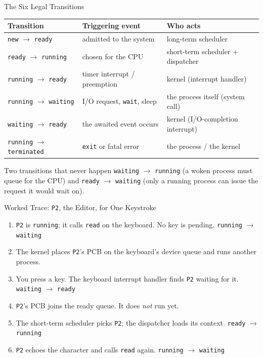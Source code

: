\documentclass[aspectratio=169]{beamer}
\begin{document}
\begin{frame}{The Six Legal Transitions}
  \small
  \renewcommand{\arraystretch}{1.2}
  \begin{tabular}{@{}p{}p{}p{}@{}}
    \textbf{Transition} & \textbf{Triggering event} & \textbf{Who acts} \\
    \hline
    \texttt{new} $\to$ \texttt{ready} & admitted to the system & long-term scheduler \\
    \texttt{ready} $\to$ \texttt{running} & chosen for the CPU & short-term scheduler + dispatcher \\
    \texttt{running} $\to$ \texttt{ready} & timer interrupt / preemption & kernel (interrupt handler) \\
    \texttt{running} $\to$ \texttt{waiting} & I/O request, \texttt{wait}, sleep & the process itself (system call) \\
    \texttt{waiting} $\to$ \texttt{ready} & the awaited event occurs & kernel (I/O-completion interrupt) \\
    \texttt{running} $\to$ \texttt{terminated} & \texttt{exit} or fatal error & the process / the kernel \\
  \end{tabular}
  \vspace{0.25cm}
  \begin{alertblock}{Two transitions that never happen}
    \texttt{waiting} $\to$ \texttt{running} (a woken process must queue for
    the CPU) and \texttt{ready} $\to$ \texttt{waiting} (only a running process
    can issue the request it would wait on).
  \end{alertblock}
\end{frame}

\begin{frame}{Worked Trace: \texttt{P2}, the Editor, for One Keystroke}
  \begin{enumerate}
    \item \texttt{P2} is \texttt{running}; it calls \texttt{read} on the
      keyboard. No key is pending. \hfill \texttt{running} $\to$ \texttt{waiting}
    \item The kernel places \texttt{P2}'s PCB on the keyboard's device queue
      and runs another process.
    \item You press a key. The keyboard interrupt handler finds \texttt{P2}
      waiting for it. \hfill \texttt{waiting} $\to$ \texttt{ready}
    \item \texttt{P2}'s PCB joins the ready queue. It does \emph{not} run yet.
    \item The short-term scheduler picks \texttt{P2}; the dispatcher loads
      its context. \hfill \texttt{ready} $\to$ \texttt{running}
    \item \texttt{P2} echoes the character and calls \texttt{read} again.
      \hfill \texttt{running} $\to$ \texttt{waiting}
  \end{enumerate}
  \vspace{0.1cm}
\end{frame}
\end{document}
